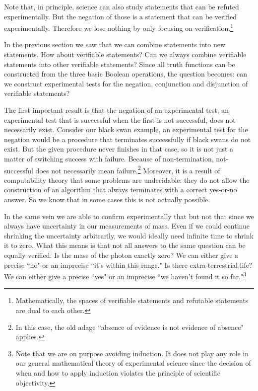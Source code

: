 \documentclass[11pt,letterpaper,fleqn]{memoir} %
\begin{document}
Note that, in principle, science can also study statements that can be refuted experimentally. But the negation of those is a statement that can be verified experimentally. Therefore we lose nothing by only focusing on verification.\footnote{Mathematically, the spaces of verifiable statements and refutable statements are dual to each other.}

In the previous section we saw that we can combine statements into new statements. How about verifiable statements? Can we always combine verifiable statements into other verifiable statements? Since all truth functions can be constructed from the three basic Boolean operations, the question becomes: can we construct experimental tests for the negation, conjunction and disjunction of verifiable statements?

The first important result is that the negation of an experimental test, an experimental test that is successful when the first is not successful, does not necessarily exist. Consider our black swan example, an experimental test for the negation would be a procedure that terminates successfully if black swans do not exist. But the given procedure never finishes in that case, so it is not just a matter of switching success with failure. Because of non-termination, not-successful does not necessarily mean failure.\footnote{In this case, the old adage ``absence of evidence is not evidence of absence" applies.} Moreover, it is a result of computability theory that some problems are undecidable: they do not allow the construction of an algorithm that always terminates with a correct yes-or-no answer. So we know that in some cases this is not actually possible.

In the same vein we are able to confirm experimentally that  but not that  since we always have uncertainty in our measurements of mass. Even if we could continue shrinking the uncertainty arbitrarily, we would ideally need infinite time to shrink it to zero. What this means is that not all answers to the same question can be equally verified. Is the mass of the photon exactly zero? We can either give a precise ``no" or an imprecise ``it's within this range." Is there extra-terrestrial life? We can either give a precise ``yes" or an imprecise ``we haven't found it so far."\footnote{Note that we are on purpose avoiding induction. It does not play any role in our general mathematical theory of experimental science since the decision of when and how to apply induction violates the principle of scientific objectivity.}
\end{document}
